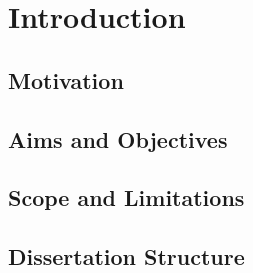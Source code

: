 \chapter{Introduction}
\label{cha:intro}

\section{Motivation}
\label{sec:intro-motivation}

\section{Aims and Objectives}
\label{sec:intro-aims}

\section{Scope and Limitations}
\label{sec:intro-scope}

\section{Dissertation Structure}
\label{sec:intro-structure}
